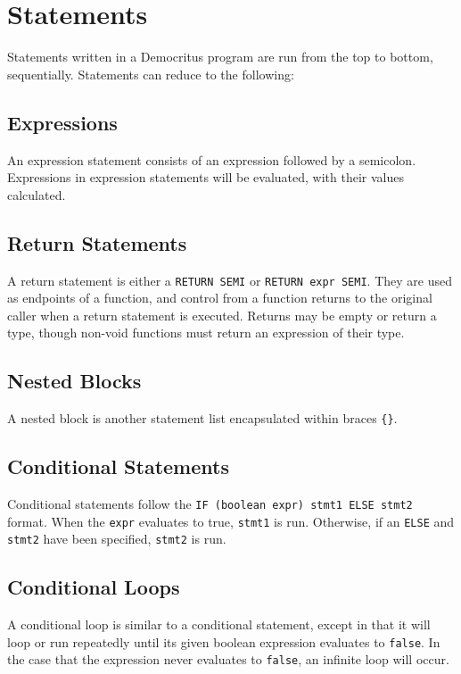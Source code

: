 \section{Statements}
    
    Statements written in a Democritus program are run from the top to bottom, sequentially. Statements can reduce to the following:

    \subsection{Expressions}
        An expression statement consists of an expression followed by a semicolon. Expressions in expression statements will be evaluated, with their values calculated.

    \subsection{Return Statements}
        A return statement is either a \texttt{RETURN SEMI} or \texttt{RETURN expr SEMI}. They are used as endpoints of a function, and control from a function returns to the original caller when a return statement is executed. Returns may be empty or return a type, though non-void functions must return an expression of their type.

    \subsection{Nested Blocks}
        A nested block is another statement list encapsulated within braces \verb|{}|.

    \subsection{Conditional Statements}
        Conditional statements follow the \verb|IF (boolean expr) stmt1 ELSE stmt2| format. When the \texttt{expr} evaluates to true, \texttt{stmt1} is run. Otherwise, if an \texttt{ELSE} and \texttt{stmt2} have been specified, \texttt{stmt2} is run. 

    \subsection{Conditional Loops}
        A conditional loop is similar to a conditional statement, except in that it will loop or run repeatedly until its given boolean expression evaluates to \texttt{false}. In the case that the expression never evaluates to \texttt{false}, an infinite loop will occur.

